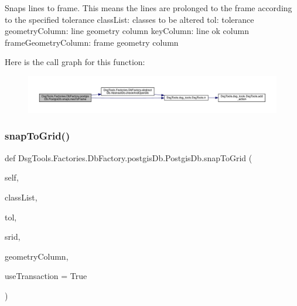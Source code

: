 \begin{DoxyVerb}Snaps lines to frame. This means the lines are prolonged to the frame according to the specified tolerance
classList: classes to be altered
tol: tolerance
geometryColumn: line geometry column
keyColumn: line ok column
frameGeometryColumn: frame geometry column
\end{DoxyVerb}
 Here is the call graph for this function\+:
\nopagebreak
\begin{figure}[H]
\begin{center}
\leavevmode
\includegraphics[width=350pt]{class_dsg_tools_1_1_factories_1_1_db_factory_1_1postgis_db_1_1_postgis_db_a014921474a7fa941678e6cf0b5ebc865_cgraph}
\end{center}
\end{figure}
\mbox{\label{class_dsg_tools_1_1_factories_1_1_db_factory_1_1postgis_db_1_1_postgis_db_afed8fbc8f90f9ec042cf9f00b9bb4514}} 
\subsubsection{\texorpdfstring{snap\+To\+Grid()}{snapToGrid()}}
{\footnotesize\ttfamily def Dsg\+Tools.\+Factories.\+Db\+Factory.\+postgis\+Db.\+Postgis\+Db.\+snap\+To\+Grid (\begin{DoxyParamCaption}\item[{}]{self,  }\item[{}]{class\+List,  }\item[{}]{tol,  }\item[{}]{srid,  }\item[{}]{geometry\+Column,  }\item[{}]{use\+Transaction = {\ttfamily True} }\end{DoxyParamCaption})}

